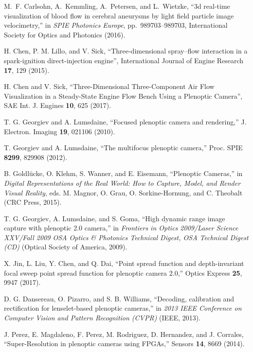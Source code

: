 \documentclass[aps,pra,amssymb,twocolumn,amsmath,superscriptaddress,showpacs,10pt]{revtex4-1}
\begin{document}
\begin{thebibliography}{10}
M.~F. Carlsohn, A.~Kemmling, A.~Petersen, and L.~Wietzke, ``3d real-time visualization of blood flow in cerebral aneurysms by light field particle image velocimetry,'' in {\em SPIE Photonics Europe}, pp.~989703--989703, International Society for Optics and Photonics (2016).

H. Chen, P. M. Lillo, and V. Sick, ``Three-dimensional spray–flow interaction in a spark-ignition direct-injection engine'', International Journal of Engine Research \textbf{17}, 129 (2015).

H. Chen and V. Sick, ``Three-Dimensional Three-Component Air Flow Visualization in a Steady-State Engine Flow Bench Using a Plenoptic Camera'', SAE Int. J. Engines \textbf{10}, 625 (2017).

T. G. Georgiev and A. Lumsdaine, ``Focused plenoptic camera and rendering,'' J. Electron. Imaging \textbf{19}, 021106 (2010).

T. Georgiev and A. Lumsdaine, ``The multifocus plenoptic camera,'' Proc. SPIE \textbf{8299}, 829908 (2012).

B. Goldl\"ucke, O. Klehm, S. Wanner, and E. Eisemann, ``Plenoptic Cameras,'' in \textit{Digital Representations of the Real World: How to Capture, Model, and Render Visual Reality}, eds. M. Magnor, O. Grau, O. Sorkine-Hornung, and C. Theobalt (CRC Press, 2015).

T. G. Georgiev, A. Lumsdaine, and S. Goma, ``High dynamic range image capture with plenoptic 2.0 camera,'' in \textit{Frontiers in Optics 2009/Laser Science XXV/Fall 2009 OSA Optics \& Photonics Technical Digest, OSA Technical Digest (CD)} (Optical Society of America, 2009).

X. Jin, L. Liu, Y. Chen, and Q. Dai, ``Point spread function and depth-invariant focal sweep point spread function for plenoptic camera $2.0$,'' Optics Express \textbf{25}, 9947 (2017).

D. G. Dansereau, O. Pizarro, and S. B. Williams, ``Decoding, calibration and rectification for lenselet-based plenoptic cameras,'' in \textit{2013 IEEE Conference on Computer Vision and Pattern Recognition (CVPR)} (IEEE, 2013).

J. Perez, E. Magdaleno, F. Perez, M. Rodriguez, D. Hernandez, and J. Corrales, ``Super-Resolution in plenoptic cameras using FPGAs,'' Sensors \textbf{14}, 8669 (2014).


\end{thebibliography}
\end{document}
